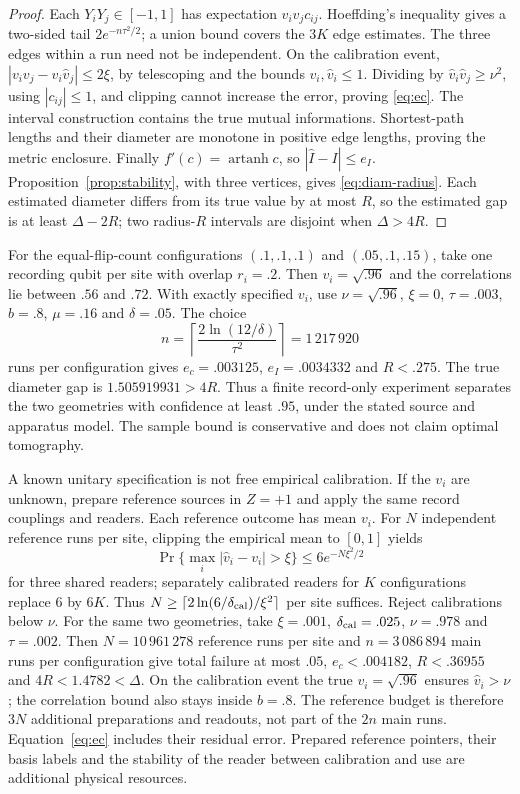 \documentclass[12pt,a4paper]{article}
\begin{document}
\begin{proof}
Each $Y_iY_j\in[-1,1]$ has expectation $v_iv_jc_{ij}$.
Hoeffding's inequality gives a two-sided tail
$2e^{-n\tau^2/2}$; a union bound covers the $3K$ edge estimates.
The three edges within a run need not be independent.
On the calibration event,
$|v_iv_j-\widehat v_i\widehat v_j|\le2\xi$, by telescoping and the
bounds $v_i,\widehat v_i\le1$. Dividing by
$\widehat v_i\widehat v_j\ge\nu^2$, using $|c_{ij}|\le1$, and
clipping cannot increase the error, proving \eqref{eq:ec}.
The interval construction contains the true mutual informations.
Shortest-path lengths and their diameter are monotone in positive
edge lengths, proving the metric enclosure. Finally
$f'(c)=\operatorname{artanh}c$, so $|\widehat I-I|\le e_I$.
Proposition~\ref{prop:stability}, with three vertices, gives
\eqref{eq:diam-radius}. Each estimated diameter differs from its true
value by at most $R$, so the estimated gap is at least $\Delta-2R$;
two radius-$R$ intervals are disjoint when $\Delta>4R$.
\end{proof}

For the equal-flip-count configurations $(.1,.1,.1)$ and
$(.05,.1,.15)$, take one recording qubit per site with overlap
$r_i=.2$. Then $v_i=\sqrt{.96}$ and the correlations lie between
$.56$ and $.72$. With exactly specified $v_i$, use $\nu=\sqrt{.96}$,
$\xi=0$, $\tau=.003$, $b=.8$, $\mu=.16$ and $\delta=.05$.
The choice
\[
n=\left\lceil\frac{2\ln(12/\delta)}{\tau^2}\right\rceil
  =1\,217\,920
\]
runs per configuration gives $e_c=.003125$,
$e_I=.0034332$ and $R<.275$.
The true diameter gap is $1.505919931>4R$.
Thus a finite record-only experiment separates the two geometries
with confidence at least $.95$, under the stated source and apparatus
model. The sample bound is conservative and does not claim optimal
tomography.

A known unitary specification is not free empirical calibration.
If the $v_i$ are unknown, prepare reference sources in $Z=+1$ and
apply the same record couplings and readers. Each reference outcome
has mean $v_i$. For $N$ independent reference runs per site,
clipping the empirical mean to $[0,1]$ yields
\[
\Pr\{\max_i|\widehat v_i-v_i|>\xi\}
   \le6e^{-N\xi^2/2}
\]
for three shared readers; separately calibrated readers for $K$
configurations replace $6$ by $6K$. Thus $N\ge\lceil2\ln(6/\delta_{\rm cal})/\xi^2\rceil$ per site
suffices. Reject calibrations below $\nu$.
For the same two geometries, take $\xi=.001$,
$\delta_{\rm cal}=.025$, $\nu=.978$ and $\tau=.002$.
Then $N=10\,961\,278$ reference runs per site and
$n=3\,086\,894$ main runs per configuration give total failure
at most $.05$, $e_c<.004182$, $R<.36955$ and $4R<1.4782<\Delta$.
On the calibration event the true $v_i=\sqrt{.96}$ ensures
$\widehat v_i>\nu$; the correlation bound also stays inside $b=.8$.
The reference budget is therefore $3N$ additional preparations and
readouts, not part of the $2n$ main runs.
Equation~\eqref{eq:ec} includes their residual error. Prepared
reference pointers, their basis labels and the stability of the
reader between calibration and use are additional physical resources.
\end{document}
